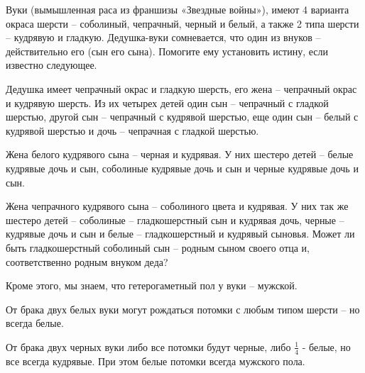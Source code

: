 
Вуки (вымышленная раса из франшизы «Звездные войны»), имеют 4 варианта окраса шерсти – соболиный, чепрачный, черный и белый, а также 
2 типа шерсти – кудрявую и гладкую. Дедушка-вуки сомневается, что один из внуков – действительно его (сын его сына). Помогите ему 
установить истину, если известно следующее.

Дедушка имеет чепрачный окрас и гладкую шерсть, его жена – чепрачный окрас и кудрявую шерсть. Из их 
четырех детей один сын – чепрачный с гладкой шерстью, другой сын – чепрачный с кудрявой шерстью, еще один сын – белый с 
кудрявой шерстью и дочь – чепрачная с гладкой шерстью.

Жена белого кудрявого сына – черная и кудрявая.  У них шестеро детей – белые кудрявые дочь и сын, 
соболиные кудрявые дочь и сын и черные кудрявые дочь и сын.

Жена чепрачного кудрявого сына – соболиного цвета и кудрявая. У них так же шестеро детей – соболиные – 
гладкошерстный сын и кудрявая дочь, черные –кудрявые дочь и сын и белые – гладкошерстный и кудрявый сыновья. 
Может ли быть гладкошерстный соболиный сын – родным сыном своего отца и, соответственно родным внуком деда?

Кроме этого, мы знаем, что гетерогаметный пол у вуки – мужской.

От брака двух белых вуки могут рождаться потомки с любым типом шерсти – но всегда белые.

От брака двух черных вуки либо все потомки будут черные, либо $\frac{1}{4}$ - белые, но все всегда кудрявые. При этом белые потомки всегда мужского пола. 
